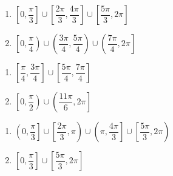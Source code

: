 \begin{multicols}{2}

\begin{enumerate}

\setcounter{enumi}{\value{HW}}

\item $\left[ 0, \dfrac{\pi}{3} \right] \cup \left[ \dfrac{2\pi}{3}, \dfrac{4\pi}{3} \right] \cup \left[ \dfrac{5\pi}{3}, 2\pi \right]$
\item $\left[ 0, \dfrac{\pi}{4} \right) \cup \left( \dfrac{3\pi}{4}, \dfrac{5\pi}{4} \right) \cup \left( \dfrac{7\pi}{4}, 2\pi \right]$

\setcounter{HW}{\value{enumi}}

\end{enumerate}

\end{multicols}

\begin{multicols}{2}

\begin{enumerate}

\setcounter{enumi}{\value{HW}}

\item $\left[ \dfrac{\pi}{4}, \dfrac{3\pi}{4} \right] \cup \left[ \dfrac{5\pi}{4}, \dfrac{7\pi}{4} \right]$
\item $\left[ 0, \dfrac{\pi}{2} \right) \cup \left( \dfrac{11\pi}{6}, 2\pi \right]$

\setcounter{HW}{\value{enumi}}

\end{enumerate}

\end{multicols}

\begin{multicols}{2}

\begin{enumerate}

\setcounter{enumi}{\value{HW}}

\item \small $\left( 0, \dfrac{\pi}{3} \right] \cup \left[ \dfrac{2\pi}{3}, \pi \right) \cup \left( \pi, \dfrac{4\pi}{3} \right] \cup \left[ \dfrac{5\pi}{3}, 2\pi \right)$ \normalsize
\item  $\left[0, \dfrac{\pi}{3}\right] \cup \left[\dfrac{5\pi}{3}, 2\pi\right]$

\setcounter{HW}{\value{enumi}}

\end{enumerate}

\end{multicols}

